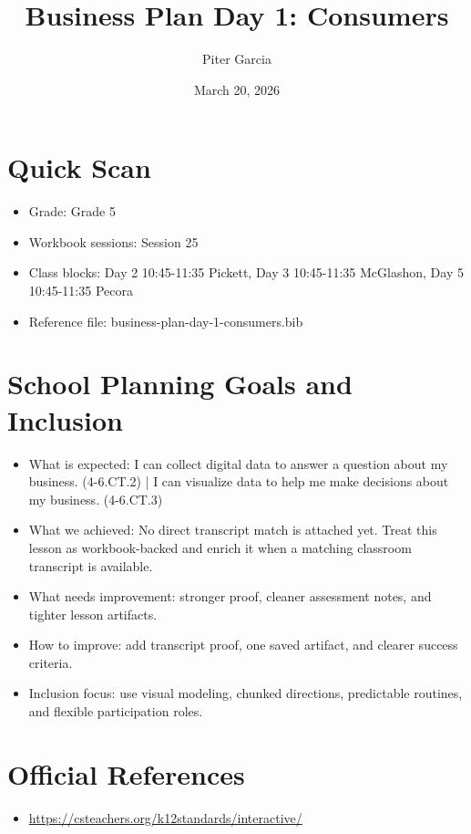 \documentclass[11pt]{article}
\title{Business Plan Day 1: Consumers}
\author{Piter Garcia}
\date{March 20, 2026}
\begin{document}
\maketitle
\section*{Quick Scan}
\begin{itemize}[leftmargin=*]
\item Grade: Grade 5
\item Workbook sessions: Session 25
\item Class blocks: Day 2 10:45-11:35 Pickett, Day 3 10:45-11:35 McGlashon, Day 5 10:45-11:35 Pecora
\item Reference file: business-plan-day-1-consumers.bib
\end{itemize}
\section*{School Planning Goals and Inclusion}
\begin{itemize}[leftmargin=*]
\item What is expected: I can collect digital data to answer a question about my business. (4-6.CT.2) | I can visualize data to help me make decisions about my business. (4-6.CT.3)
\item What we achieved: No direct transcript match is attached yet. Treat this lesson as workbook-backed and enrich it when a matching classroom transcript is available.
\item What needs improvement: stronger proof, cleaner assessment notes, and tighter lesson artifacts.
\item How to improve: add transcript proof, one saved artifact, and clearer success criteria.
\item Inclusion focus: use visual modeling, chunked directions, predictable routines, and flexible participation roles.
\end{itemize}
\section*{Official References}
\begin{itemize}[leftmargin=*]
\item \url{https://csteachers.org/k12standards/interactive/}

\end{itemize}
\end{document}

